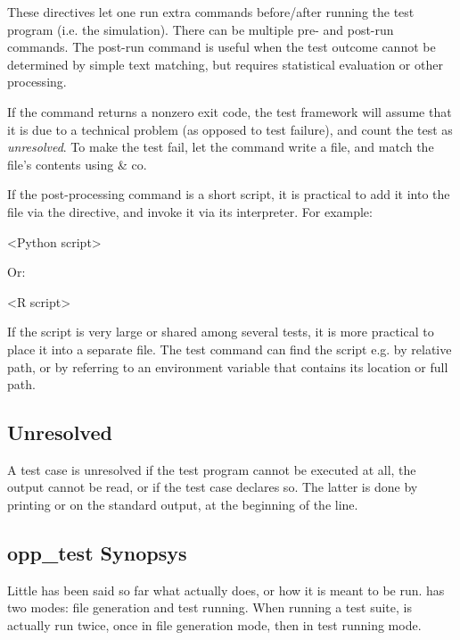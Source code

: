 These directives let one run extra commands before/after running the test
program (i.e. the simulation). There can be multiple pre- and post-run
commands. The post-run command is useful when the test outcome cannot be determined
by simple text matching, but requires statistical evaluation or other processing.

If the command returns a nonzero exit code, the test framework will assume that
it is due to a technical problem (as opposed to test failure), and count the
test as \textit{unresolved}. To make the test fail, let the command write a
file, and match the file's contents using  \& co.

If the post-processing command is a short script, it is practical
to add it into the  file via the  directive,
and invoke it via its interpreter. For example:

\begin{filelisting}
<Python script>
\end{filelisting}

Or:

\begin{filelisting}
<R script>
\end{filelisting}

If the script is very large or shared among several tests, it is more practical
to place it into a separate file. The test command can find the script e.g.
by relative path, or by referring to an environment variable that contains
its location or full path.


\subsection{Unresolved}
\label{sec:testing:opptest:unresolved}

A test case is unresolved if the test program cannot be executed at all, the
output cannot be read, or if the test case declares so. The latter is done
by printing  or  on the
standard output, at the beginning of the line.


\subsection{opp\_test Synopsys}
\label{sec:testing:opptest:synopsys}

Little has been said so far what  actually does, or how it
is meant to be run.  has two modes: file generation and
test running. When running a test suite,  is actually run
twice, once in file generation mode, then in test running mode.

